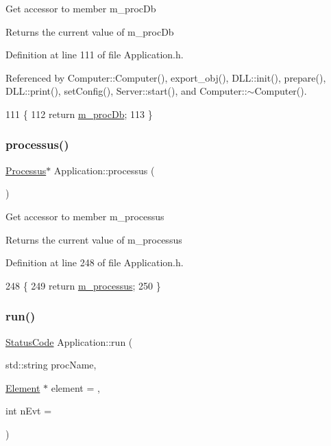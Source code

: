 Get accessor to member m\+\_\+proc\+Db \begin{DoxyReturn}{Returns}
the current value of m\+\_\+proc\+Db 
\end{DoxyReturn}


Definition at line 111 of file Application.\+h.



Referenced by Computer\+::\+Computer(), export\+\_\+obj(), D\+L\+L\+::init(), prepare(), D\+L\+L\+::print(), set\+Config(), Server\+::start(), and Computer\+::$\sim$\+Computer().


\begin{DoxyCode}
111                           \{
112     \textcolor{keywordflow}{return} \hyperlink{classApplication_af030cefeb69586f01e965606d5dd8919}{m\_procDb};
113   \}
\end{DoxyCode}
\mbox{\label{classApplication_a8d0918e800a5de01795bc2669d74ed82}} 
\subsubsection{\texorpdfstring{processus()}{processus()}}
{\footnotesize\ttfamily \hyperlink{classProcessus}{Processus}$\ast$ Application\+::processus (\begin{DoxyParamCaption}{ }\end{DoxyParamCaption})\hspace{0.3cm}{\ttfamily [inline]}}

Get accessor to member m\+\_\+processus \begin{DoxyReturn}{Returns}
the current value of m\+\_\+processus 
\end{DoxyReturn}


Definition at line 248 of file Application.\+h.


\begin{DoxyCode}
248                           \{
249     \textcolor{keywordflow}{return} \hyperlink{classApplication_ab5eb4b3d3bef5ab9fce9c69401ce5786}{m\_processus};
250   \}
\end{DoxyCode}
\mbox{\label{classApplication_a7fdd5bfee44e49896292f8964037384d}} 
\subsubsection{\texorpdfstring{run()}{run()}}
{\footnotesize\ttfamily \hyperlink{classStatusCode}{Status\+Code} Application\+::run (\begin{DoxyParamCaption}\item[{std\+::string}]{proc\+Name,  }\item[{\hyperlink{classElement}{Element} $\ast$}]{element = {},  }\item[{int}]{n\+Evt = {} }\end{DoxyParamCaption})}

